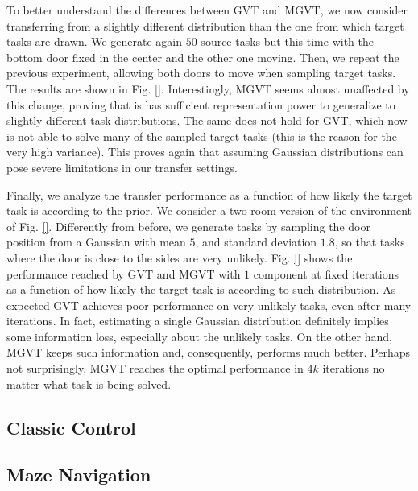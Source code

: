 \documentclass{article}
\begin{document}
To better understand the differences between GVT and MGVT, we now consider transferring from a slightly different distribution than the one from which target tasks are drawn. We generate again $50$ source tasks but this time with the bottom door fixed in the center and the other one moving. Then, we repeat the previous experiment, allowing both doors to move when sampling target tasks. The results are shown in Fig. \ref{}. Interestingly, MGVT seems almost unaffected by this change, proving that is has sufficient representation power to generalize to slightly different task distributions. The same does not hold for GVT, which now is not able to solve many of the sampled target tasks (this is the reason for the very high variance). This proves again that assuming Gaussian distributions can pose severe limitations in our transfer settings.

Finally, we analyze the transfer performance as a function of how likely the target task is according to the prior. We consider a two-room version of the environment of Fig. \ref{}. Differently from before, we generate tasks by sampling the door position from a Gaussian with mean $5$, and standard deviation $1.8$, so that tasks where the door is close to the sides are very unlikely. Fig. \ref{} shows the performance reached by GVT and MGVT with $1$ component at fixed iterations as a function of how likely the target task is according to such distribution. As expected GVT achieves poor performance on very unlikely tasks, even after many iterations. In fact, estimating a single Gaussian distribution definitely implies some information loss, especially about the unlikely tasks. On the other hand, MGVT keeps such information and, consequently, performs much better. Perhaps not surprisingly, MGVT reaches the optimal performance in $4k$ iterations no matter what task is being solved.

\subsection{Classic Control} \label{sec:cc}

\subsection{Maze Navigation} \label{sec:mn}
\end{document}
